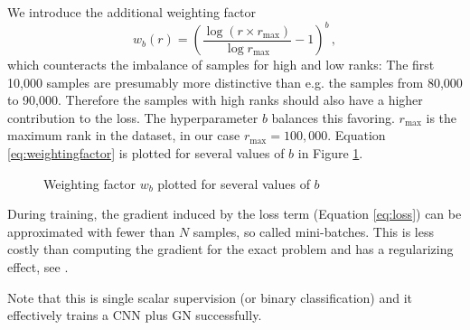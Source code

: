 We introduce the additional weighting factor
\begin{equation}\label{eq:weightingfactor}
    w_b(r)=\left(\frac{\log\left(r\times r_\text{max}\right)}{\log r_\text{max}}-1\right)^b\,,
\end{equation}which counteracts the imbalance of samples for high and low ranks: The first 10,000 samples are presumably more distinctive than e.g. the samples from 80,000 to 90,000. Therefore the samples with high ranks should also have a higher contribution to the loss. The hyperparameter $b$ balances this favoring. $r_\text{max}$ is the maximum rank in the dataset, in our case $r_\text{max}=100,000$. Equation \ref{eq:weightingfactor} is plotted for several values of $b$ in Figure \ref{fig:weightingfactor}.

\begin{figure}\centering
    \caption{Weighting factor $w_b$ plotted for several values of $b$}\label{fig:weightingfactor}
\end{figure}

During training, the gradient induced by the loss term (Equation \ref{eq:loss}) can be approximated with fewer than $N$ samples, so called mini-batches. This is less costly than computing the gradient for the exact problem and has a regularizing effect, see \cite{DBLP:journals/corr/KeskarMNST16}.

Note that this is single scalar supervision (or binary classification) and it effectively trains a CNN plus GN successfully.

